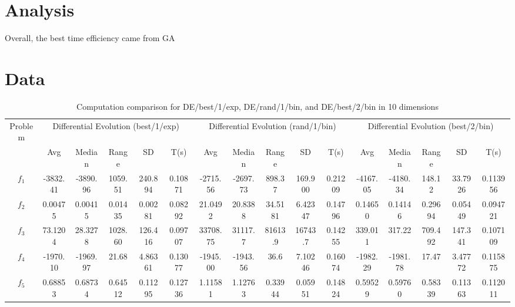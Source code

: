 \documentclass[paper=a4, fontsize=11pt]{scrartcl} %
\numberwithin{equation}{section} %
\numberwithin{figure}{section} %
\numberwithin{table}{section} %
\begin{document}
	\pagebreak
	
\section{Analysis}
Overall, the best time efficiency came from GA

	
\section{Data}



\begin{landscape}
	\begin{table}
		\tiny
		\centering
		\caption{Computation comparison for DE/best/1/exp, DE/rand/1/bin, and DE/best/2/bin in 10 dimensions}
		\label{Tab1d}
		\begin{tabular}{c|ccccc|ccccc|ccccc}
			\noalign{\smallskip}\hline\noalign{\smallskip}
			Problem & \multicolumn{5}{c}{Differential Evolution (best/1/exp)}& \multicolumn{5}{|c|}{Differential Evolution (rand/1/bin)} &  \multicolumn{5}{c}{Differential Evolution (best/2/bin)} \\ 
			\noalign{\smallskip}\hline\noalign{\smallskip}
			& Avg & Median & Range & SD & T(s) & Avg & Median
			& Range & SD & T(s) & Avg & Median & Range & SD &
			T(s) \\ 
			\noalign{\smallskip}\hline\noalign{\smallskip}
			$f_{1}$  & -3832.41 & -3890.96 & 1059.51 & 240.894 & 0.10871 & -2715.56 & -2697.73 & 898.37  & 169.900 & 0.21209 & -4167.05 & -4180.34 & 148.12  & 33.7926 & 0.113956\\
			$f_{2}$  &  0.00475 &  0.00415 & 0.01435 & 0.00281 & 0.08292 &  21.0492 &  20.8388 & 34.5181 & 6.42347 & 0.14796 &  0.14650 &  0.14146 & 0.29694 & 0.05449 & 0.094721\\
			$f_{3}$  &  73.1204 &  28.3278 & 1028.60 & 126.416 & 0.09707 & 33708.75 &  31117.7 & 81613.9 & 16743.7 & 0.14255 &  339.011 &  317.22  & 709.492 & 147.341 & 0.107109\\
			$f_{4}$  & -1970.10 & -1969.97 & 21.68   & 4.86361 & 0.13077 & -1945.00 & -1943.56 & 36.6    & 7.10246 & 0.16074 & -1982.29 & -1981.78 & 17.47   & 3.47772 & 0.115875\\
			$f_{5}$  &  0.68853 &  0.68734 & 0.64512 & 0.11295 & 0.12736 &  1.11581 &  1.12763 & 0.33944 & 0.05951 & 0.14824 &  0.59529 &  0.59760 & 0.58339 & 0.11363 & 0.112011\\

\end{tabular}
\end{table}
\end{landscape}
\end{document}
